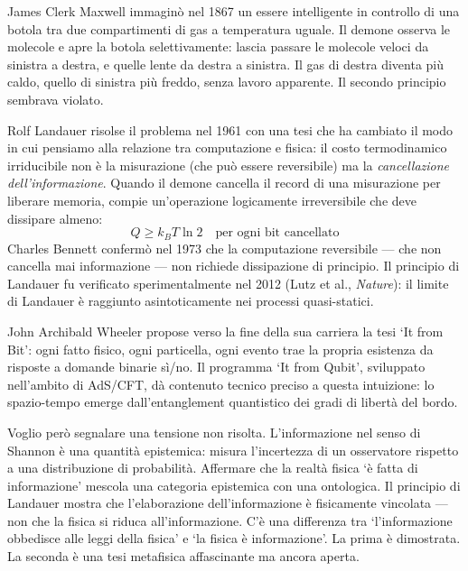 \documentclass[12pt,a4paper,openany]{book}
\newcommand{\sezione}[1]{\vspace{1.2em}{\large\bfseries #1}\vspace{0.5em}\par}
\begin{document}
\sezione{Il demone di Maxwell e il principio di Landauer}

James Clerk Maxwell immaginò nel 1867 un essere intelligente in controllo di una botola tra due compartimenti di gas a temperatura uguale. Il demone osserva le molecole e apre la botola selettivamente: lascia passare le molecole veloci da sinistra a destra, e quelle lente da destra a sinistra. Il gas di destra diventa più caldo, quello di sinistra più freddo, senza lavoro apparente. Il secondo principio sembrava violato.

Rolf Landauer risolse il problema nel 1961 con una tesi che ha cambiato il modo in cui pensiamo alla relazione tra computazione e fisica: il costo termodinamico irriducibile non è la misurazione (che può essere reversibile) ma la \textit{cancellazione dell'informazione}. Quando il demone cancella il record di una misurazione per liberare memoria, compie un'operazione logicamente irreversibile che deve dissipare almeno:
\[
Q \geq k_B T \ln 2 \quad \text{per ogni bit cancellato}
\]
Charles Bennett confermò nel 1973 che la computazione reversibile — che non cancella mai informazione — non richiede dissipazione di principio. Il principio di Landauer fu verificato sperimentalmente nel 2012 (Lutz et al., \textit{Nature}): il limite di Landauer è raggiunto asintoticamente nei processi quasi-statici.

\sezione{It from Bit: Wheeler e il programma informazionale}

John Archibald Wheeler propose verso la fine della sua carriera la tesi `It from Bit': ogni fatto fisico, ogni particella, ogni evento trae la propria esistenza da risposte a domande binarie sì/no. Il programma `It from Qubit', sviluppato nell'ambito di AdS/CFT, dà contenuto tecnico preciso a questa intuizione: lo spazio-tempo emerge dall'entanglement quantistico dei gradi di libertà del bordo.

Voglio però segnalare una tensione non risolta. L'informazione nel senso di Shannon è una quantità epistemica: misura l'incertezza di un osservatore rispetto a una distribuzione di probabilità. Affermare che la realtà fisica `è fatta di informazione' mescola una categoria epistemica con una ontologica. Il principio di Landauer mostra che l'elaborazione dell'informazione è fisicamente vincolata — non che la fisica si riduca all'informazione. C'è una differenza tra `l'informazione obbedisce alle leggi della fisica' e `la fisica è informazione'. La prima è dimostrata. La seconda è una tesi metafisica affascinante ma ancora aperta.
\end{document}
